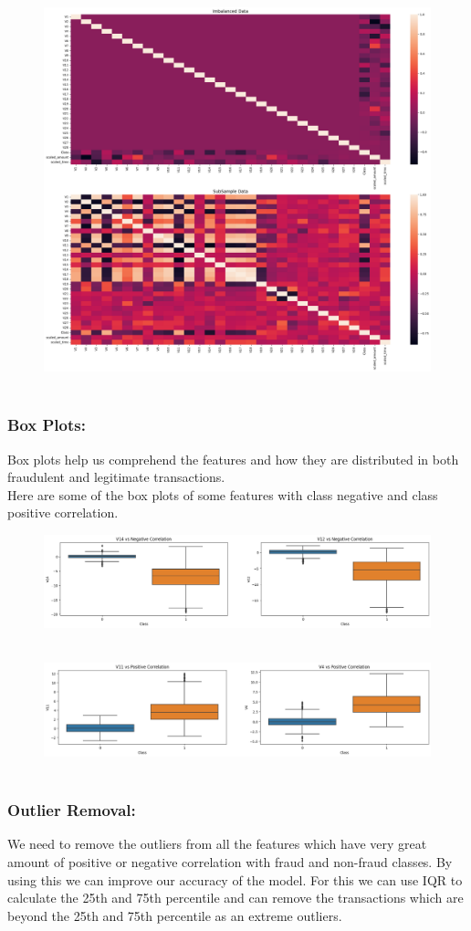 \documentclass{article}
\begin{document}
\begin{figure}[!h]
\centering
\includegraphics[width = 4 in]{img2.png}~
\end{figure}

\subsubsection{Box Plots:}
Box plots help us comprehend the features and how they are distributed in both fraudulent and legitimate transactions.\\
Here are some of the box plots of some features with class negative and class positive correlation.

\begin{figure}[!h]
\centering
\includegraphics[width = 4 in]{img3.png}~
\end{figure}

\begin{figure}[!h]
\centering
\includegraphics[width = 4 in]{img4.png}~
\end{figure}

\subsubsection{Outlier Removal:}
We need to remove the outliers from all the features which have very great amount of positive or negative correlation with fraud and non-fraud classes. By using this we can improve our accuracy of the model. For this we can use IQR to calculate the 25th and 75th percentile and can remove the transactions which are beyond the 25th and 75th percentile as an extreme outliers.\\
\end{document}
